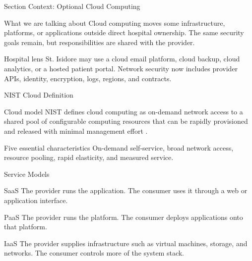 \documentclass[presentation]{beamer}
\begin{document}
\begin{frame}[c]{Section Context: Optional Cloud Computing}
\begin{block}{What we are talking about}
Cloud computing moves some infrastructure, platforms, or applications outside direct hospital
ownership. The same security goals remain, but responsibilities are shared with the provider.
\end{block}

\begin{exampleblock}{Hospital lens}
St. Isidore may use a cloud email platform, cloud backup, cloud analytics, or a hosted patient
portal. Network security now includes provider APIs, identity, encryption, logs, regions, and
contracts.
\end{exampleblock}
\end{frame}

\begin{frame}[c]{NIST Cloud Definition}
\begin{block}{Cloud model}
NIST defines cloud computing as on-demand network access to a shared pool of configurable computing
resources that can be rapidly provisioned and released with minimal management effort
\cite{nist800145}.
\end{block}

\begin{block}{Five essential characteristics}
On-demand self-service, broad network access, resource pooling, rapid elasticity, and measured
service.
\end{block}
\end{frame}

\begin{frame}[c]{Service Models}
\begin{block}{SaaS}
The provider runs the application. The consumer uses it through a web or application interface.
\end{block}

\begin{block}{PaaS}
The provider runs the platform. The consumer deploys applications onto that platform.
\end{block}

\begin{block}{IaaS}
The provider supplies infrastructure such as virtual machines, storage, and networks. The consumer
controls more of the system stack.
\end{block}
\end{frame}
\end{document}
